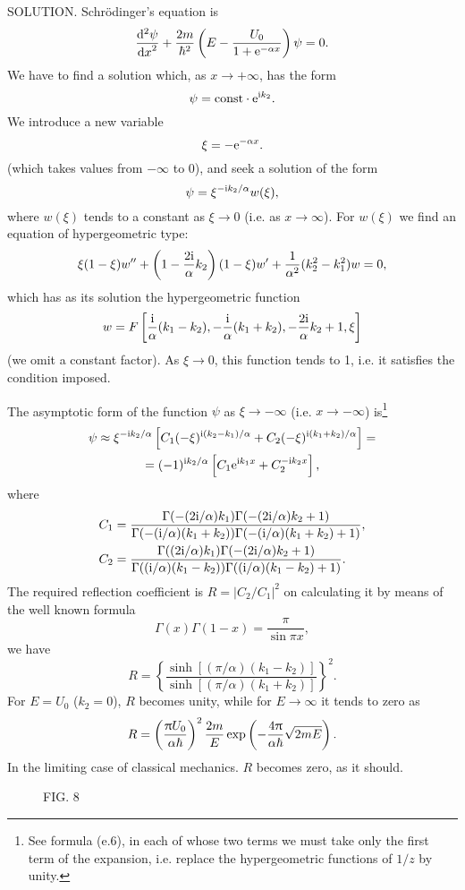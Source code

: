 {SOLUTION. Schr\"odinger's equation is
\[ \frac{\mathrm{d}^2\psi}{{\mathrm{d} x}^2}+\frac{2m}{\hbar^2}\left(E-\frac{U_0}{1+\mathrm{e}^{-\alpha x}} \right)\psi=0. \]
We have to find a solution which, as $ x \to +\infty $, has the form
\[ \psi=\mathrm{const}\cdot\mathrm{e}^{\mathrm{i} k_2}. \]
We introduce a new variable
\[ \xi=-\mathrm{e}^{-\alpha x} .\]
(which takes values from $ -\infty $ to $ 0 $), and seek a solution of the form
\[ \psi=\xi^{-\mathrm{i} k_2/\alpha}w(\xi), \]
where $ w (\xi) $ tends to a constant as $ \xi\to 0 $ (i.e. as $ x \to\infty $). For $ w (\xi) $ we find an equation of hypergeometric type:
\[ \xi(1-\xi)w''+\left(1-\frac{2\mathrm{i}}{\alpha}k_2 \right)(1-\xi)w'+\frac{1}{\alpha^2}(k_2^2-k_1^2)w=0, \]
which has as its solution the hypergeometric function
\[ w=F\left[\frac{\mathrm{i}}{\alpha}(k_1-k_2),-\frac{\mathrm{i}}{\alpha}(k_1+k_2),-\frac{2\mathrm{i}}{\alpha}k_2+1,\xi \right] \]
(we omit a constant factor). As $ \xi\to0 $, this function tends to 1, i.e. it satisfies the condition imposed.

The asymptotic form of the function $\psi$ as $ \xi\to-\infty $ (i.e. $ x \to-\infty $) is\footnote{See formula (e.6), in each of whose two terms we must take only the first term of the expansion, i.e. replace the hypergeometric functions of $ 1/z $ by unity.
}
\begin{multline*}
\psi\approx\xi^{-\mathrm{i} k_2/\alpha}\left[C_1(-\xi)^{\mathrm{i}(k_2-k_1)/\alpha}+C_2(-\xi)^{\mathrm{i}(k_1+k_2)/\alpha} \right]=\\
=(-1)^{\mathrm{i} k_2/\alpha}\left[C_1\mathrm{e}^{\mathrm{i} k_1 x}+C_2^{-\mathrm{i} k_2 x} \right],
\end{multline*}
where
\begin{align*}
C_1&=\frac{\Gamma(-(2\mathrm{i}/\alpha)k_1)\Gamma(-(2\mathrm{i}/\alpha)k_2+1)}{\Gamma(-(\mathrm{i}/\alpha)(k_1+k_2))\Gamma(-(\mathrm{i}/\alpha)(k_1+k_2)+1)},\\
C_2&=\frac{\Gamma((2\mathrm{i}/\alpha)k_1)\Gamma(-(2\mathrm{i}/\alpha)k_2+1)}{\Gamma((\mathrm{i}/\alpha)(k_1-k_2))\Gamma((\mathrm{i}/\alpha)(k_1-k_2)+1)}.
\end{align*}
The required reflection coefficient is $ R = |C_2/C_1|^2 $ on calculating it by means of the well known formula
\[ \Gamma(x)\Gamma(1-x)=\frac{\pi}{\sin\pi x}, \]
we have
\[ R=\left\{\frac{\sinh\left[(\pi/\alpha)(k_1-k_2) \right]}{\sinh[(\pi/\alpha)(k_1+k_2)]} \right\}^2. \]
For $ E = U_0 $ ($ k_2 = 0 $), $ R $ becomes unity, while for $ E\to\infty $ it tends to zero as
\[ R=\left(\frac{\uppi U_0}{\alpha\hbar} \right)^2\frac{2m}{E}\exp\left(-\frac{4\uppi}{\alpha\hbar}\sqrt{2mE} \right). \]
In the limiting case of classical mechanics. $ R $ becomes zero, as it should.


\begin{wrapfigure}[6]{l}[0cm]{0cm}
	\caption{FIG. 8}\label{Fig.8}
\end{wrapfigure}




}
